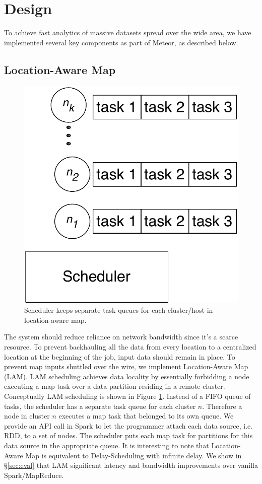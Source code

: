 \section{Design}
\label{sec: design}

To achieve fast analytics of massive datasets spread over the wide area, we have implemented several key components as part of Meteor, as described below.

\subsection{Location-Aware Map}

\begin{figure}[!ht]
\centering\includegraphics[width=0.5\columnwidth]{figs/lam.pdf}
\vspace{-1.2em}
\caption{Scheduler keeps separate task queues for each cluster/host in location-aware map.}
\label{fig:lam}
\vspace{.7em}
\end{figure}

The system should reduce reliance on network bandwidth since it's a scarce resource. To prevent backhauling
all the data from every location to a centralized location at the beginning of the job, input data should remain in place. To prevent map inputs shuttled over the wire, we implement Location-Aware Map (LAM). LAM scheduling achieves data locality by essentially forbidding a node executing a map task over a data partition residing in a remote cluster. Conceptually LAM scheduling is shown in Figure \ref{fig:lam}. Instead of a FIFO queue of tasks, the scheduler has a separate task queue for each cluster $n$. Therefore a node in cluster $n$ executes a map task that
belonged to its own queue. We provide an API call in Spark to let the programmer attach each data source, i.e. RDD, to a set of nodes. The scheduler puts each map task for partitions for this data source in the appropriate queue. It is interesting to note that Location-Aware Map is equivalent to Delay-Scheduling \cite{delay-scheduling} with infinite delay.
We show in \S \ref{sec:eval}  that LAM significant latency and bandwidth improvements over vanilla Spark/MapReduce. 

